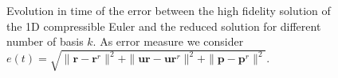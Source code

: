 \begin{figure}
\begin{subfigure}[]{0.48\linewidth}
\end{subfigure}
\caption{Evolution in time of the error  between the high fidelity solution of the 1D compressible Euler and the reduced solution for different number of basis $k$. As error measure we consider $e(t)=\sqrt{\|\mathbf{r}-\mathbf{r}^r\|^2+\|\mathbf{ur}-\mathbf{ur}^r\|^2+\|\mathbf{p}-\mathbf{p}^r\|^2}$.}
\label{error_behaviour_1D}
\end{figure}

